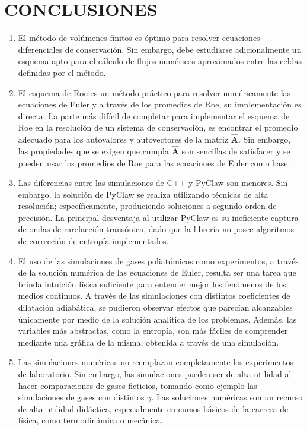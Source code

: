 

\chapter{CONCLUSIONES}
\begin{enumerate}
	\item El método de volúmenes finitos es óptimo para resolver ecuaciones diferenciales de conservación. Sin embargo, debe estudiarse adicionalmente un esquema apto para el cálculo de flujos numéricos aproximados entre las celdas definidas por el método.
	\item El esquema de Roe es un método práctico para resolver numéricamente las ecuaciones de Euler y a través de los promedios de Roe, su implementación es directa. La parte más difícil de completar para implementar el esquema de Roe en la resolución de un sistema de conservación, es encontrar el  promedio adecuado para los autovalores y autovectores de la matriz $\hat{\mathbf{A}}$. Sin embargo, las propiedades que se exigen que cumpla $\hat{\mathbf{A}}$ son sencillas de satisfacer y se pueden usar los promedios de Roe para las ecuaciones de Euler como base.
	\item Las diferencias entre las simulaciones de C++ y PyClaw son menores. Sin embargo, la solución de PyClaw se realiza utilizando técnicas de alta resolución; específicamente, produciendo soluciones a segundo orden de precisión. La principal desventaja al utilizar PyClaw es su ineficiente captura de ondas de rarefacción transónica, dado que la librería no posee algoritmos de corrección de entropía implementados.
	\item El uso de las simulaciones de gases poliatómicos como experimentos, a través de la solución numérica de las ecuaciones de Euler, resulta ser una tarea que brinda intuición física suficiente para entender mejor los fenómenos de los medios continuos. A través de las simulaciones con distintos coeficientes de dilatación adiabática, se pudieron observar efectos que parecían alcanzables únicamente por medio de la solución analítica de los problemas. Además, las variables más abstractas, como la entropía, son más fáciles de comprender mediante una gráfica de la misma, obtenida a través de una simulación.
	\item Las simulaciones numéricas no reemplazan completamente los experimentos de laboratorio. Sin embargo, las simulaciones pueden ser de alta utilidad al hacer comparaciones de gases ficticios, tomando como ejemplo las simulaciones de gases con distintos $\gamma$. Las soluciones numéricas son un recurso de alta utilidad didáctica, especialmente en cursos básicos de la carrera de física, como termodinámica o mecánica.
\end{enumerate}

